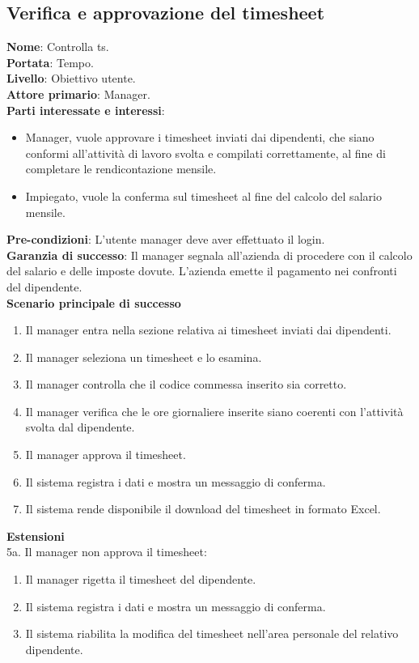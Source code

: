 \subsection{Verifica e approvazione del timesheet}
\textbf{Nome}: Controlla ts.\\
\textbf{Portata}: Tempo.\\
\textbf{Livello}: Obiettivo utente.\\
\textbf{Attore primario}: Manager.\\
\textbf{Parti interessate e interessi}: 
\begin{itemize}
    \item Manager, vuole approvare i timesheet inviati dai dipendenti, che siano conformi all'attività di lavoro svolta e compilati correttamente, al fine di completare le rendicontazione mensile.
    \item Impiegato, vuole la conferma sul timesheet al fine del calcolo del salario mensile.
\end{itemize}
\textbf{Pre-condizioni}: L'utente manager deve aver effettuato il login.\\
\textbf{Garanzia di successo}: Il manager segnala all'azienda di procedere con il calcolo del salario e delle imposte dovute. L’azienda emette il pagamento nei confronti del dipendente.\\
\textbf{Scenario principale di successo}
\begin{enumerate}
    \item Il manager entra nella sezione relativa ai timesheet inviati dai dipendenti.
    \item Il manager seleziona un timesheet e lo esamina.
    \item Il manager controlla che il codice commessa inserito sia corretto. 
    \item Il manager verifica che le ore giornaliere inserite siano coerenti con l'attività svolta dal dipendente.
    \item Il manager approva il timesheet.
    \item Il sistema registra i dati e mostra un messaggio di conferma.
    \item Il sistema rende disponibile il download del timesheet in formato Excel.
\end{enumerate}
\textbf{Estensioni}\\
5a. Il manager non approva il timesheet: 
\begin{enumerate}
    \item Il manager rigetta il timesheet del dipendente.
    \item Il sistema registra i dati e mostra un messaggio di conferma.
    \item Il sistema riabilita la modifica del timesheet nell'area personale del relativo dipendente.
\end{enumerate}

